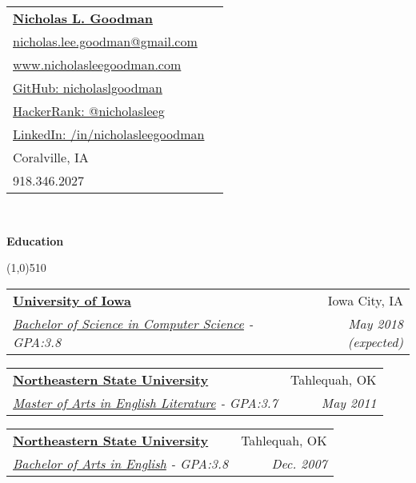 \documentclass[letterpaper,11pt]{article}
\makeatletter
\newcommand{\resheading}[1]{{\large {\begin{minipage}{\textwidth}{\textbf{#1 \vphantom{p\^{E}}}}\end{minipage}}}}
\newcommand{\ressubheading}[4]{
\begin{tabular*}{6.5in}{l@{\extracolsep{\fill}}r}
		\textbf{#1} & #2 \\
		\textit{#3} & \textit{#4} \\
\end{tabular*}\vspace{-6pt}}
\makeatother
\begin{document}
\newcommand{\mywebheader}{
\begin{tabular*}{7in}{l@{\extracolsep{\fill}}r}
	\textbf{\href{http://www.nicholasleegoodman.com/}{\LARGE Nicholas L. Goodman}}\\
	\href{mailto:nicholas.lee.goodman@gmail.com}{nicholas.lee.goodman@gmail.com}\\
	\href{http://www.nicholasleegoodman.com}{www.nicholasleegoodman.com} \\ 
	\href{https://github.com/nicholaslgoodman}{GitHub: nicholaslgoodman} \\
	\href{https://www.hackerrank.com/nicholasleeg}{HackerRank: @nicholasleeg} \\ 
	\href{https://www.linkedin.com/in/nicholasleegoodman}{LinkedIn: /in/nicholasleegoodman} \\
	
	{Coralville, IA} \\
	{918.346.2027}
	\end{tabular*}
\\
\renewcommand{\labelitemi}{$-$}

\vspace{0.1in}}

\mywebheader



\resheading {Education}

\line(1,0){510}

	\begin{description}

		\item
			\ressubheading {\href{http://www.truman.edu}{University of Iowa}}{Iowa City, IA}{\href{http://www.truman.edu/majors-programs/majors-minors/computer-science-major/}{Bachelor of Science in Computer Science} - {GPA:3.8}}{ \footnotesize{May 2018 (expected)}}

		\item	
			\ressubheading{\href{http://www.nsuok.edu}{Northeastern State University}}{Tahlequah, OK}{\href{https://www.nsuok.edu/Academics/DegreesMajors/GraduateMasters.aspx}{Master of Arts in English Literature} - {GPA:3.7}}{ \footnotesize{May 2011}}
		\item	
			\ressubheading{\href{http://www.nsuok.edu}{Northeastern State University}}{Tahlequah, OK}{\href{https://www.nsuok.edu/Academics/DegreesMajors/Tahlequah.aspx}{Bachelor of Arts in English} - {GPA:3.8}}{ \footnotesize{Dec. 2007}}
		\end{description} %
\end{document}
